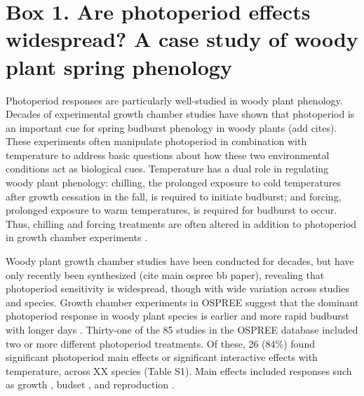 \documentclass{article}
\begin{document}
\section*{Box 1. Are photoperiod effects widespread? A case study of woody plant spring phenology}
Photoperiod responses are particularly well-studied in woody plant phenology. Decades of experimental growth chamber studies have shown that photoperiod is an important cue for spring budburst phenology in woody plants (add cites). These experiments often manipulate photoperiod in combination with temperature to address basic questions about how these two environmental conditions act as biological cues. Temperature has a dual role in regulating woody plant phenology: chilling, the prolonged exposure to cold temperatures after growth cessation in the fall, is required to initiate budburst; and forcing, prolonged exposure to warm temperatures, is required for budburst to occur. Thus, chilling and forcing treatments are often altered in addition to photoperiod in growth chamber experiments \citep[e.g.,][]{Campbell:1975aa,HEIDE:1977aa,Falusi:1990aa,Spann:2004aa,Laube:2014a}. %
\par Woody plant growth chamber studies have been conducted for decades, but have only recently been synthesized (cite main ospree bb paper), revealing that photoperiod sensitivity is widespread, though with wide variation across studies and species. Growth chamber experiments in OSPREE suggest that the dominant photoperiod response in woody plant species is earlier and more rapid budburst with longer days \citep [e.g., ][]{Caffarra:2011a}. Thirty-one of the 85 studies in the OSPREE database included two or more different photoperiod treatments. Of these, 26 (84\%) found significant photoperiod main effects or significant interactive effects with temperature, across XX species (Table S1). Main effects included responses such as growth \citep[e.g., higher growth rates with longer days][]{Ashby:1962aa}, budset \citep[e.g., more rapid induction of budset with shorter days][]{Howe:1995aa}, and reproduction \citep[e.g., increased flowering with longer days][]{Heide:2012aa}. 
\end{document}
